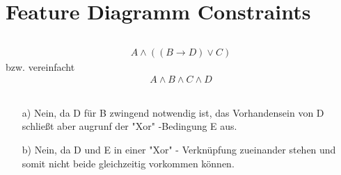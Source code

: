 \chapter{Feature Diagramm Constraints}
\section{}
\begin{align*}
A \wedge ( (B \rightarrow D) \vee C)
\end{align*}
bzw. vereinfacht\\
\begin{align*}
	A \wedge B \wedge C \wedge D
\end{align*}

\section{}
  \begin{enumerate}
  	\item[a)] Nein, da D für B zwingend notwendig ist, das Vorhandensein von D schließt aber augrunf der "Xor" -Bedingung E aus.
  	\item[b)] Nein, da D und E in einer "Xor" - Verknüpfung zueinander stehen und somit nicht beide gleichzeitig vorkommen können.
  \end{enumerate}
